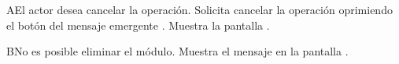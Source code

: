	\begin{UCtrayectoriaA}{A}{El actor desea cancelar la operación.}
		\UCpaso[\UCactor] Solicita cancelar la operación oprimiendo el botón  del mensaje emergente .
		\UCpaso[\UCsist] Muestra la pantalla .
	\end{UCtrayectoriaA}

	\begin{UCtrayectoriaA}{B}{No es posible eliminar el módulo.}
		\UCpaso[\UCsist] Muestra el mensaje  en la pantalla .
	\end{UCtrayectoriaA}
	

